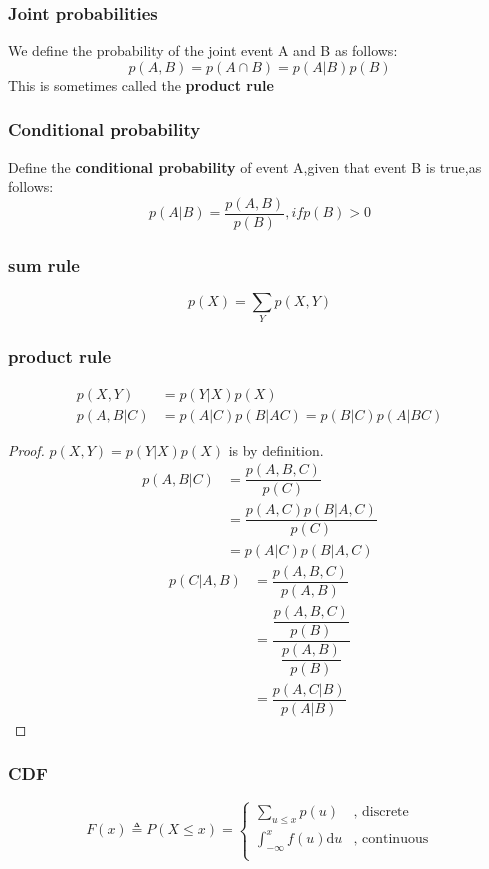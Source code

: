 \subsubsection{Joint probabilities}
We define the probability of the joint event A and B as follows:
\begin{equation}
p(A,B) = p(A\cap B) = p(A|B)p(B)
\end{equation}
This is sometimes called the \textbf{product rule}
\subsubsection{Conditional probability}
Define the \textbf{conditional probability} of event A,given that event B is true,as follows:
\begin{equation}
p(A|B)= \frac{p(A,B)}{p(B)},if p(B) > 0
\end{equation}

\subsubsection{sum rule}
\begin{equation}
p(X) = \sum_{Y}p(X,Y)
\end{equation}

\subsubsection{product rule}
\begin{align}
p(X,Y) &= p(Y|X)p(X) \\
p(A,B|C) &= p(A|C)p(B|AC) = p(B|C)p(A|BC)
\end{align}
\begin{proof}
	$p(X,Y) = p(Y|X)p(X)$ is by definition.
	\begin{align}
		p(A,B|C) &= \dfrac{p(A,B,C)}{p(C)} \\
		&=\dfrac{p(A,C)p(B|A,C)}{p(C)}\\
		&=p(A|C)p(B|A,C)
	\end{align}
		\begin{align}
		p(C|A,B) &= \dfrac{p(A,B,C)}{p(A,B)} \\
		&=\dfrac{\dfrac{p(A,B,C)}{p(B)}}{\dfrac{p(A,B)}{p(B)}}\\
		&=\dfrac{p(A,C|B)}{p(A|B)}
		\end{align}
\end{proof}

\subsubsection{CDF}
\begin{equation}
F(x) \triangleq P(X \leq x)=\begin{cases}
\sum_{u \leq x}p(u) & \text{, discrete}\\
\int_{-\infty}^{x} f(u)\mathrm{d}u & \text{, continuous}\\
\end{cases}
\end{equation}


